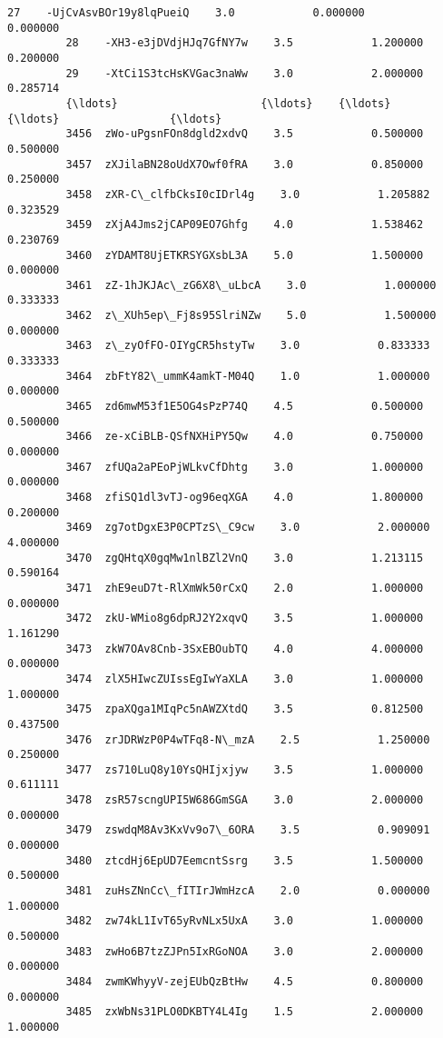 \documentclass[11pt]{article}
\begin{document}
\begin{Verbatim}[commandchars=\\\{\}]
         27    -UjCvAsvBOr19y8lqPueiQ    3.0            0.000000            0.000000   
         28    -XH3-e3jDVdjHJq7GfNY7w    3.5            1.200000            0.200000   
         29    -XtCi1S3tcHsKVGac3naWw    3.0            2.000000            0.285714   
         {\ldots}                      {\ldots}    {\ldots}                 {\ldots}                 {\ldots}   
         3456  zWo-uPgsnFOn8dgld2xdvQ    3.5            0.500000            0.500000   
         3457  zXJilaBN28oUdX7Owf0fRA    3.0            0.850000            0.250000   
         3458  zXR-C\_clfbCksI0cIDrl4g    3.0            1.205882            0.323529   
         3459  zXjA4Jms2jCAP09EO7Ghfg    4.0            1.538462            0.230769   
         3460  zYDAMT8UjETKRSYGXsbL3A    5.0            1.500000            0.000000   
         3461  zZ-1hJKJAc\_zG6X8\_uLbcA    3.0            1.000000            0.333333   
         3462  z\_XUh5ep\_Fj8s95SlriNZw    5.0            1.500000            0.000000   
         3463  z\_zyOfFO-OIYgCR5hstyTw    3.0            0.833333            0.333333   
         3464  zbFtY82\_ummK4amkT-M04Q    1.0            1.000000            0.000000   
         3465  zd6mwM53f1E5OG4sPzP74Q    4.5            0.500000            0.500000   
         3466  ze-xCiBLB-QSfNXHiPY5Qw    4.0            0.750000            0.000000   
         3467  zfUQa2aPEoPjWLkvCfDhtg    3.0            1.000000            0.000000   
         3468  zfiSQ1dl3vTJ-og96eqXGA    4.0            1.800000            0.200000   
         3469  zg7otDgxE3P0CPTzS\_C9cw    3.0            2.000000            4.000000   
         3470  zgQHtqX0gqMw1nlBZl2VnQ    3.0            1.213115            0.590164   
         3471  zhE9euD7t-RlXmWk50rCxQ    2.0            1.000000            0.000000   
         3472  zkU-WMio8g6dpRJ2Y2xqvQ    3.5            1.000000            1.161290   
         3473  zkW7OAv8Cnb-3SxEBOubTQ    4.0            4.000000            0.000000   
         3474  zlX5HIwcZUIssEgIwYaXLA    3.0            1.000000            1.000000   
         3475  zpaXQga1MIqPc5nAWZXtdQ    3.5            0.812500            0.437500   
         3476  zrJDRWzP0P4wTFq8-N\_mzA    2.5            1.250000            0.250000   
         3477  zs710LuQ8y10YsQHIjxjyw    3.5            1.000000            0.611111   
         3478  zsR57scngUPI5W686GmSGA    3.0            2.000000            0.000000   
         3479  zswdqM8Av3KxVv9o7\_6ORA    3.5            0.909091            0.000000   
         3480  ztcdHj6EpUD7EemcntSsrg    3.5            1.500000            0.500000   
         3481  zuHsZNnCc\_fITIrJWmHzcA    2.0            0.000000            1.000000   
         3482  zw74kL1IvT65yRvNLx5UxA    3.0            1.000000            0.500000   
         3483  zwHo6B7tzZJPn5IxRGoNOA    3.0            2.000000            0.000000   
         3484  zwmKWhyyV-zejEUbQzBtHw    4.5            0.800000            0.000000   
         3485  zxWbNs31PLO0DKBTY4L4Ig    1.5            2.000000            1.000000   
         

\end{Verbatim}
\end{document}
